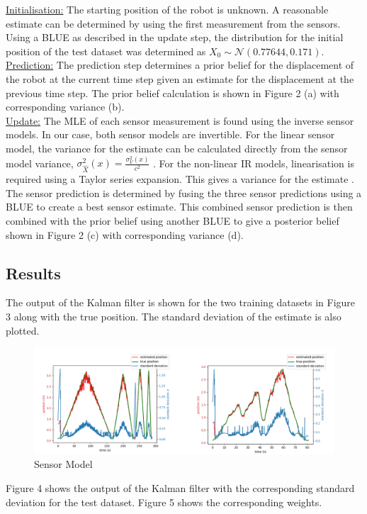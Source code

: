 \documentclass[a4paper,12pt]{article}
\begin{document}
\underline{Initialisation:} The starting position of the robot is unknown. A reasonable estimate can be determined by using the first measurement from the sensors. Using a BLUE as described in the update step, the distribution for the initial position of the test dataset was determined as $X_0 \sim \mathcal{N}(0.77644,0.171)$.
\\
\underline{Prediction:} The prediction step determines a prior belief for the displacement of the robot at the current time step given an estimate for the displacement at the previous time step. The prior belief calculation is shown in Figure 2 (a) with corresponding variance (b).
\\
\underline{Update:} The MLE of each sensor measurement is found using the inverse sensor models. In our case, both sensor models are invertible. For the linear sensor model, the variance for the estimate can be calculated directly from the sensor model variance, $\sigma_{\hat{X}}^2(x) = \frac{\sigma_{V}^2(x)}{c^2}$ . For the non-linear IR models, linearisation is required using a Taylor series expansion. This gives a variance for the estimate . The sensor prediction is determined by fusing the three sensor predictions using a BLUE to create a best sensor estimate. This combined sensor prediction is then combined with the prior belief using another BLUE to give a posterior belief shown in Figure 2 (c) with corresponding variance (d).

\subsection{Results}
The output of the Kalman filter is shown for the two training datasets in Figure 3 along with the true position. The standard deviation of the estimate is also plotted.

\begin{figure}[h]
\includegraphics[width=16cm]{result1}
\centering
\caption{Sensor Model}
\end{figure}

Figure 4 shows the output of the Kalman filter with the corresponding standard deviation for the test dataset. Figure 5 shows the corresponding weights.
\end{document}
